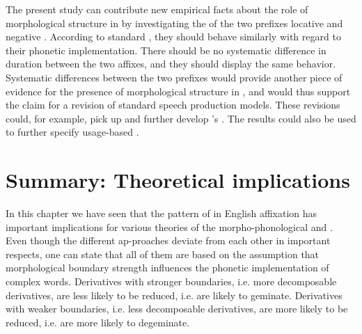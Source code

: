  

 
 
 The present study can contribute new empirical facts about the role of morphological structure in  by investigating the  of the two  prefixes locative and negative . According to standard , they should behave similarly with regard to their phonetic implementation. There should be no systematic difference in duration between the two affixes, and they should display the same  behavior. Systematic differences between the two prefixes would provide another piece of evidence for the presence of morphological structure in , and would thus support the claim for a revision of standard speech production models. These revisions could, for example, pick up and further develop \citeauthor{CohenGoldberg.2013}'s  . The results could also be used to further specify usage-based .



 
 




\section{Summary: Theoretical implications}\label{summary predictions}

 In this chapter we have seen that the pattern of  in En\-glish affixation has important implications for various theories of the morpho-phonological and . Even though the different ap-\linebreak proaches deviate from each other in important respects, one can state that all of them are based on the assumption that morphological boundary strength influences the phonetic implementation of complex words. Derivatives with stronger boundaries, i.e. more decomposable derivatives, are less likely to be reduced, i.e. are likely to geminate. Derivatives with weaker boundaries, i.e. less decomposable derivatives, are more likely to be reduced, i.e. are more likely to degeminate. 
 


